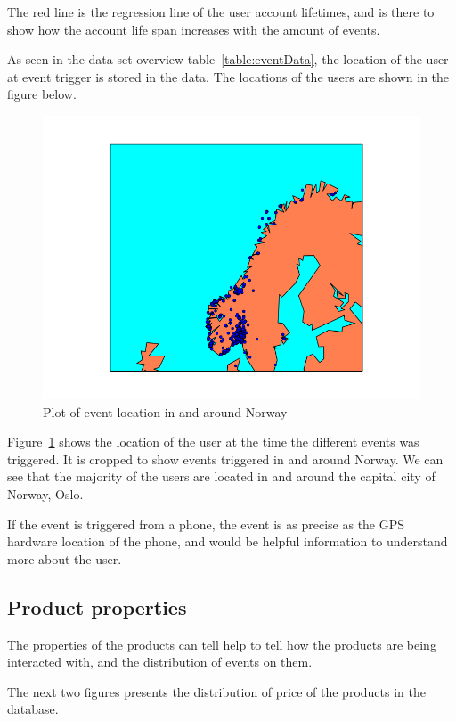         The red line is the regression line of the user account lifetimes, and is there to show how the account life span increases with the amount of events.

        As seen in the data set overview table~\ref{table:eventData}, the location of the user at event trigger is stored in the data. The locations of the users are shown in the figure below.

    \begin{figure}[H]
        \includegraphics[width=5in]{image/simpleGeoPlotNorway.png}
        \centering
        \caption{Plot of event location in and around Norway}
    \label{figure:croppedGeoplot}
    \end{figure}
        Figure~\ref{figure:croppedGeoplot} shows the location of the user at the time the different events was triggered.
        It is cropped to show events triggered in and around Norway.
        We can see that the majority of the users are located in and around the capital city of Norway, Oslo.

        If the event is triggered from a phone, the event is as precise as the GPS hardware location of the phone, and would be helpful information to understand more about the user.

\subsection{Product properties}
    The properties of the products can tell help to tell how the products are being interacted with, and the distribution of events on them.

    The next two figures presents the distribution of price of the products in the database.

